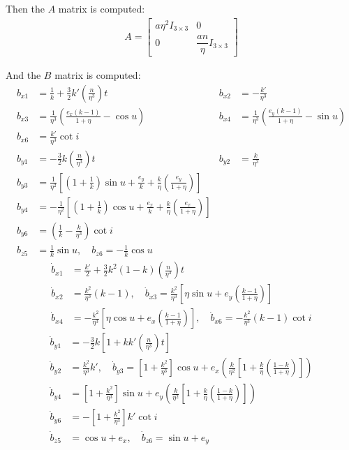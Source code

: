Then the $A$ matrix is computed:
\begin{align}
A = 
\begin{bmatrix}
a \eta^2 I_{3 \times 3} & 0 \\
0 & \dfrac{a n}{\eta} I_{3 \times 3}
\end{bmatrix}
\end{align}

And the $B$ matrix is computed:
\begin{align}
b_{x1} &= \frac{1}{k} + \frac{3}{2}k' \left(\frac{n}{\eta^3}\right)t &
b_{x2} &= -\frac{k'}{\eta^3} \\
b_{x3} &= \frac{1}{\eta^3}\left(\frac{e_x(k - 1)}{1 + \eta} - \cos u\right) &
b_{x4} &= \frac{1}{\eta^3}\left(\frac{e_y(k - 1)}{1 + \eta} - \sin u\right) \\
b_{x6} &= \frac{k'}{\eta^3} \cot i \\
b_{y1} &= -\frac{3}{2}k \left(\frac{n}{\eta^3}\right)t &
b_{y2} &= \frac{k}{\eta^3} \\
b_{y3} &= \frac{1}{\eta^2}\left[(1 + \frac{1}{k})\sin u + \frac{e_y}{k} + \frac{k}{\eta}\left(\frac{e_y}{1 + \eta}\right)\right] \\
b_{y4} &= -\frac{1}{\eta^2}\left[(1 + \frac{1}{k})\cos u + \frac{e_x}{k} + \frac{k}{\eta}\left(\frac{e_x}{1 + \eta}\right)\right] \\
b_{y6} &= \left(\frac{1}{k} - \frac{k}{\eta^3} \right) \cot i \\
b_{z5} &= \frac{1}{k} \sin u, \quad
b_{z6} = -\frac{1}{k} \cos u
\end{align}
\begin{align}
\dot{b}_{x1} &= \frac{k'}{2} + \frac{3}{2}k^2(1 - k)\left(\frac{n}{\eta^3}\right)t \\
\dot{b}_{x2} &= \frac{k^2}{\eta^3}(k - 1), \quad
\dot{b}_{x3} = \frac{k^2}{\eta^3}\left[\eta \sin u + e_y \left( \frac{k - 1}{1 + \eta} \right)\right] \\
\dot{b}_{x4} &= -\frac{k^2}{\eta^3}\left[\eta \cos u + e_x \left( \frac{k - 1}{1 + \eta} \right)\right], \quad
\dot{b}_{x6} = -\frac{k^2}{\eta^3}(k - 1)\cot i
\end{align}
\begin{align}
\dot{b}_{y1} &= -\frac{3}{2}k\left[1 + kk'\left(\frac{n}{\eta^3}\right)t\right] \\
\dot{b}_{y2} &= \frac{k^2}{\eta^3}k', \quad
\dot{b}_{y3} = \left[1 + \frac{k^2}{\eta^3}\right]\cos u + e_x\left(\frac{k}{\eta^2}\left[1 + \frac{k}{\eta}\left(\frac{1 - k}{1 + \eta}\right)\right]\right) \\
\dot{b}_{y4} &= \left[1 + \frac{k^2}{\eta^3}\right]\sin u + e_y\left(\frac{k}{\eta^2}\left[1 + \frac{k}{\eta}\left(\frac{1 - k}{1 + \eta}\right)\right]\right) \\
\dot{b}_{y6} &= -\left[1 + \frac{k^2}{\eta^3}\right]k'\cot i \\
\dot{b}_{z5} &= \cos u + e_x, \quad
\dot{b}_{z6} = \sin u + e_y
\end{align}

